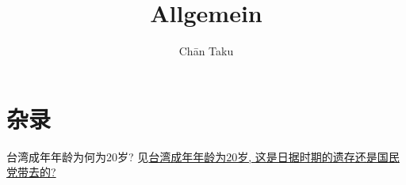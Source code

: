 \documentclass{article}
\title{Allgemein}
\author{Ch\=an Taku}
\begin{document}
\maketitle

\section*{杂录}

台湾成年年龄为何为20岁? 见\href{https://www.zhihu.com/question/63447930}{台湾成年年龄为20岁, 这是日据时期的遗存还是国民党带去的?}

% 
% 
\end{document}
